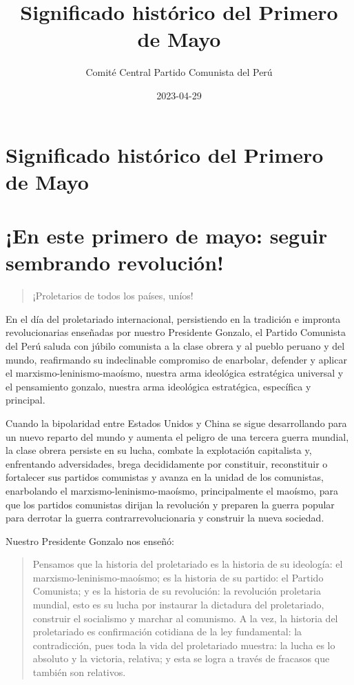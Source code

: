 \documentclass[
  jou,
  floatsintext,
  longtable,
  a4paper,
  nolmodern,
  notxfonts,
  notimes,
  12pt,
  colorlinks=true,linkcolor=blue,citecolor=blue,urlcolor=blue]{apa7}
\title{Significado histórico del Primero de Mayo}
\author{Comité Central Partido Comunista del Perú}
\date{2023-04-29}
\begin{document}
\maketitle


\hypertarget{toc}{}
\tableofcontents
\newpage
\section[Introduction]{Significado histórico del Primero de Mayo}

\setcounter{secnumdepth}{3}

\setlength\LTleft{0pt}




\section{¡En este primero de mayo: seguir sembrando
revolución!}\label{en-este-primero-de-mayo-seguir-sembrando-revoluciuxf3n}

\begin{quote}
¡Proletarios de todos los países, uníos!
\end{quote}

En el día del proletariado internacional, persistiendo en la tradición e
impronta revolucionarias enseñadas por nuestro Presidente Gonzalo, el
Partido Comunista del Perú saluda con júbilo comunista a la clase obrera
y al pueblo peruano y del mundo, reafirmando su indeclinable compromiso
de enarbolar, defender y aplicar el marxismo-leninismo-maoísmo, nuestra
arma ideológica estratégica universal y el pensamiento gonzalo, nuestra
arma ideológica estratégica, específica y principal.

Cuando la bipolaridad entre Estados Unidos y China se sigue
desarrollando para un nuevo reparto del mundo y aumenta el peligro de
una tercera guerra mundial, la clase obrera persiste en su lucha,
combate la explotación capitalista y, enfrentando adversidades, brega
decididamente por constituir, reconstituir o fortalecer sus partidos
comunistas y avanza en la unidad de los comunistas, enarbolando el
marxismo-leninismo-maoísmo, principalmente el maoísmo, para que los
partidos comunistas dirijan la revolución y preparen la guerra popular
para derrotar la guerra contrarrevolucionaria y construir la nueva
sociedad.

Nuestro Presidente Gonzalo nos enseñó:

\begin{quote}
Pensamos que la historia del proletariado es la historia de su
ideología: el marxismo-leninismo-maoísmo; es la historia de su partido:
el Partido Comunista; y es la historia de su revolución: la revolución
proletaria mundial, esto es su lucha por instaurar la dictadura del
proletariado, construir el socialismo y marchar al comunismo. A la vez,
la historia del proletariado es confirmación cotidiana de la ley
fundamental: la contradicción, pues toda la vida del proletariado
muestra: la lucha es lo absoluto y la victoria, relativa; y esta se
logra a través de fracasos que también son relativos.
\end{quote}
\end{document}
